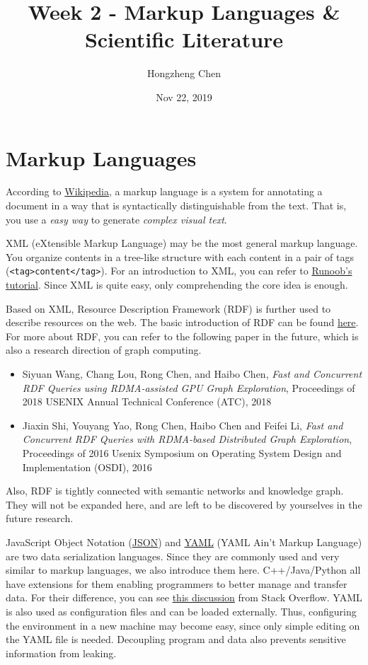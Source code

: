 \documentclass[english]{../TexTemplate/thesis}
\title{Week 2 - Markup Languages \& Scientific Literature}
\author{Hongzheng Chen}
\date{Nov 22, 2019}
\begin{document}
\maketitle

\section{Markup Languages}
According to \href{https://en.wikipedia.org/wiki/Markup_language}{Wikipedia}, a markup language is a system for annotating a document in a way that is syntactically distinguishable from the text. That is, you use a \emph{easy way} to generate \emph{complex visual text}.

XML (eXtensible Markup Language) may be the most general markup language. You organize contents in a tree-like structure with each content in a pair of tags (\verb'<tag>content</tag>').
For an introduction to XML, you can refer to \href{https://www.runoob.com/xml/xml-tutorial.html}{Runoob's tutorial}. Since XML is quite easy, only comprehending the core idea is enough.

Based on XML, Resource Description Framework (RDF) is further used to describe resources on the web. The basic introduction of RDF can be found \href{https://www.w3schools.com/xml/xml_rdf.asp}{here}. For more about RDF, you can refer to the following paper in the future, which is also a research direction of graph computing.
\begin{itemize}
\item Siyuan Wang, Chang Lou, Rong Chen, and Haibo Chen, \emph{Fast and Concurrent RDF Queries using RDMA-assisted GPU Graph Exploration}, Proceedings of 2018 USENIX Annual Technical Conference (ATC), 2018
\item Jiaxin Shi, Youyang Yao, Rong Chen, Haibo Chen and Feifei Li, \emph{Fast and Concurrent RDF Queries with RDMA-based Distributed Graph Exploration}, Proceedings of 2016 Usenix Symposium on Operating System Design and Implementation (OSDI), 2016
\end{itemize}
Also, RDF is tightly connected with semantic networks and knowledge graph. They will not be expanded here, and are left to be discovered by yourselves in the future research.

JavaScript Object Notation (\href{https://www.w3school.com.cn/json/index.asp}{JSON}) and \href{https://www.runoob.com/w3cnote/yaml-intro.html}{YAML} (YAML Ain't Markup Language) are two data serialization languages. Since they are commonly used and very similar to markup languages, we also introduce them here. C++/Java/Python all have extensions for them enabling programmers to better manage and transfer data. For their difference, you can see \href{https://stackoverflow.com/questions/1726802/what-is-the-difference-between-yaml-and-json}{this discussion} from Stack Overflow.
YAML is also used as configuration files and can be loaded externally.
Thus, configuring the environment in a new machine may become easy, since only simple editing on the YAML file is needed.
Decoupling program and data also prevents sensitive information from leaking.
\end{document}
